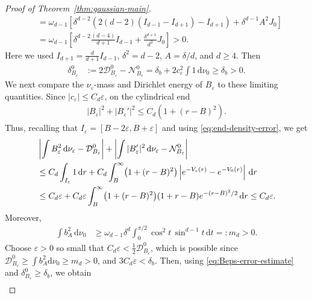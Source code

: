 \documentclass[11pt,reqno]{amsart}
\numberwithin{equation}{section}
\theoremstyle{definition}
\theoremstyle{remark}
\newcommand{\ud}{\mathrm{d}}
\newcommand{\0}{\emptyset}
\newcommand{\veps}{\varepsilon}
\newcommand{\calD}{\mathcal D}
\newcommand{\calN}{\mathcal N}
\begin{document}
\begin{proof}[Proof of Theorem~\ref{thm:gaussian-main}]
\begin{align}
        &=
        \omega_{d-1}
        \left[
        \delta^{d-2}
        \left(
        2(d-2)(I_{d-1}-I_{d+1})-I_{d+1}
        \right)
        +
        \delta^{d-1}A^2J_0
        \right] \\
        &=
        \omega_{d-1}
        \left[
        \delta^{d-2}\frac{(d-4)}{d+1}I_{d-1}
        +
        \frac{\delta^{d+1}}{d^2}J_0
        \right]
        >0.
\end{align}
Here we used \(I_{d+1}=\frac{d}{d+1}I_{d-1}\), \(\delta^2=d-2\), \(A=\delta/d\), and  \(d\geq4\). Then
\begin{align}
        \delta_{B_\veps}^0
        &:=
        2\calD_{B_\veps}^0-\calN_{B_\veps}^0=
        \delta_b+2c_\veps^2\int1\,\ud\nu_0
        \geq
        \delta_b>0.
\end{align}
We next compare the \(\nu_\veps\)-mass and Dirichlet energy of \(B_\veps\) to these limiting
quantities. Since \(|c_\veps|\leq C_d\veps\), on the cylindrical end
\begin{align}
        |B_\veps|^2+|B_\veps'|^2
        \leq C_d(1+(r-B)^2).
\end{align}
Thus, recalling that \(I_\veps=[B-2\veps,B+\veps]\) and using \eqref{eq:end-density-error}, we get
\begin{align}\label{eq:Beps-error-estimate}
        &\left|
        \int B_\veps^2\,\ud\nu_\veps-\calD_{B_\veps}^0
        \right|
        +
        \left|
        \int |B_\veps'|^2\,\ud\nu_\veps-\calN_{B_\veps}^0
        \right| \notag\\
        &\leq
        C_d\int_{I_\veps}1\,\ud r
        +
        C_d\int_B^\infty
        \bigl(1+(r-B)^2\bigr)
        \left|e^{-V_\veps(r)}-e^{-V_0(r)}\right|
        \,\ud r \notag\\
        &\leq
        C_d\veps
        +
        C_d\veps
        \int_B^\infty
        \bigl(1+(r-B)^2\bigr)(1+r-B)e^{-(r-B)^2/2}
        \,\ud r
        \leq
        C_d\veps.
\end{align}
Moreover,
\begin{align}
        \int b_A^2\,\ud\nu_0
        &\geq
        \omega_{d-1}
        \delta^d
        \int_0^{\pi/2}\cos^2t\,\sin^{d-1}t\,\ud t  
        =:m_d>0.
\end{align}
Choose \(\veps>0\) so small that \(C_d\veps<\frac12\calD_{B_\veps}^0\), which is possible since $\calD_{B_\veps}^0\geq \int b^2_A \ud\nu_0\geq m_d>0$, and
\(3C_d\veps<\delta_b\). Then, using \eqref{eq:Beps-error-estimate} and
\(\delta_{B_\veps}^0\geq\delta_b\), we obtain
\begin{align}

\end{align}
\end{proof}
\end{document}
